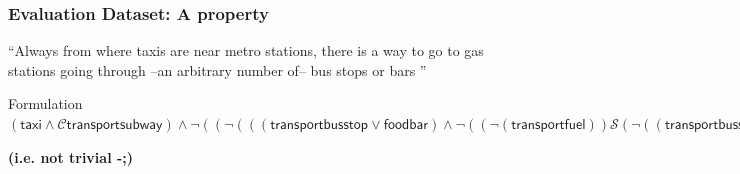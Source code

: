\documentclass[pdf,10pt]{beamer}
\begin{document}
\begin{frame}[t]\frametitle{Evaluation Dataset: A property}

``Always from where taxis are near metro stations, there is a way to go to gas stations going through --an arbitrary number of-- bus stops or bars ''





\begin{exampleblock}{Formulation}
$(\mathsf{taxi} \wedge \mathcal{C} \mathsf{transportsubway}) \wedge \neg((\neg( ((\mathsf{transportbusstop} \vee \mathsf{foodbar}) \wedge \neg((\neg (\mathsf{transportfuel})) \mathcal{S}(\neg((\mathsf{transportbusstop} \vee \mathsf{foodbar}) \vee (\mathsf{transportfuel}))))) \wedge ((\mathsf{transportbusstop} \vee \mathsf{foodbar}) \wedge \neg((\neg (\mathsf{taxi} \wedge \mathcal{C} \mathsf{transportsubway}))\mathcal{S}(\neg((\mathsf{transportbusstop} \vee \mathsf{foodbar}) \vee (\mathsf{taxi} \wedge \mathcal{C} \mathsf{transportsubway}))))) )) \mathcal{S} (\neg((\mathsf{taxi} \wedge \mathcal{C} \mathsf{transportsubway}) \vee ( ((\mathsf{transportbusstop} \vee \mathsf{foodbar}) \wedge \neg((\neg (\mathsf{transportfuel})) \mathcal{S} (\neg((\mathsf{transportbusstop} \vee \mathsf{foodbar}) \vee (\mathsf{transportfuel}))))) \wedge ((\mathsf{transportbusstop} \vee \mathsf{foodbar}) \wedge \neg((\neg (\mathsf{taxi} \wedge \mathcal{C} \mathsf{transportsubway})) \mathcal{S} (\neg((\mathsf{transportbusstop} \vee \mathsf{foodbar}) \vee (\mathsf{taxi} \wedge \mathcal{C} \mathsf{transportsubway}))))) ))))$
\end{exampleblock}


\textbf{(i.e. not trivial -;)}

\end{frame}
\end{document}
